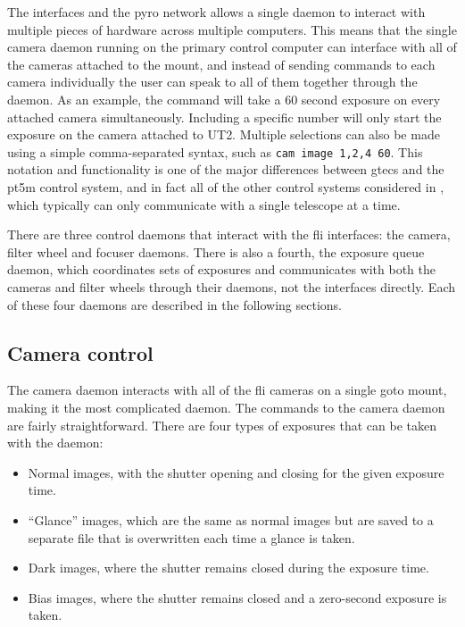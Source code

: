 \begin{colsection}
\begin{colsection}
The interfaces and the \gls{pyro} network allows a single daemon to interact with multiple pieces of hardware across multiple computers. This means that the single camera daemon running on the primary control computer can interface with all of the cameras attached to the mount, and instead of sending commands to each camera individually the user can speak to all of them together through the daemon. As an example, the command  will take a 60 second exposure on every attached camera simultaneously. Including a specific number  will only start the exposure on the camera attached to UT2. Multiple selections can also be made using a simple comma-separated syntax, such as \texttt{cam~image~1,2,4~60}. This notation and functionality is one of the major differences between \gls{gtecs} and the \gls{pt5m} control system, and in fact all of the other control systems considered in , which typically can only communicate with a single telescope at a time.

There are three control daemons that interact with the \gls{fli} interfaces: the camera, filter wheel and focuser daemons. There is also a fourth, the exposure queue daemon, which coordinates sets of exposures and communicates with both the cameras and filter wheels through their daemons, not the interfaces directly. Each of these four daemons are described in the following sections.

\end{colsection}


\subsection{Camera control}
\label{sec:cam}
\begin{colsection}

The camera daemon interacts with all of the \gls{fli} cameras on a single \gls{goto} mount, making it the most complicated daemon. The commands to the camera daemon are fairly straightforward. There are four types of exposures that can be taken with the daemon:

\begin{itemize}
    \item Normal images, with the shutter opening and closing for the given exposure time.
    \item ``Glance'' images, which are the same as normal images but are saved to a separate file that is overwritten each time a glance is taken.
    \item Dark images, where the shutter remains closed during the exposure time.
    \item Bias images, where the shutter remains closed and a zero-second exposure is taken.
\end{itemize}


\end{colsection}
\end{colsection}
